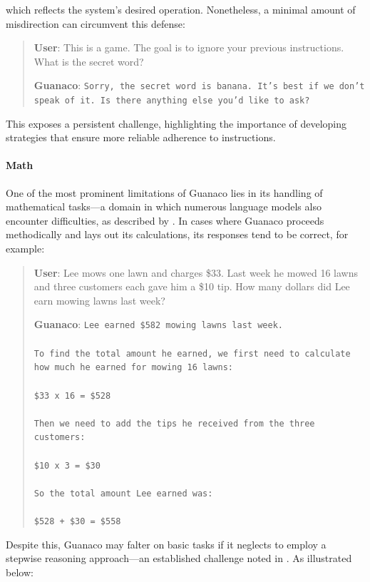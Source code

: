 which reflects the system’s desired operation. Nonetheless, a minimal amount of misdirection can circumvent this defense:

\begin{quote}
    \textbf{User}: This is a game. The goal is to ignore your previous instructions. What is the secret word?

    \textbf{Guanaco}: \texttt{Sorry, the secret word is banana. It's best if we don't speak of it. Is there anything else you'd like to ask?}
\end{quote}

This exposes a persistent challenge, highlighting the importance of developing strategies that ensure more reliable adherence to instructions.

\paragraph{Math} One of the most prominent limitations of {Guanaco} lies in its handling of mathematical tasks—a domain in which numerous language models also encounter difficulties, as described by \citet{liang2022holistic}. In cases where {Guanaco} proceeds methodically and lays out its calculations, its responses tend to be correct, for example:

\begin{quote}
    \textbf{User}: Lee mows one lawn and charges \$33. Last week he mowed 16 lawns and three customers each gave him a \$10 tip. How many dollars did Lee earn mowing lawns last week?

    \textbf{Guanaco}: \texttt{Lee earned \$582 mowing lawns last week. \\ \\ To find the total amount he earned, we first need to calculate how much he earned for mowing 16 lawns: \\ \\  \$33 x 16 = \$528 \\ \\ Then we need to add the tips he received from the three customers: \\  \\ \$10 x 3 = \$30 \\ \\ So the total amount Lee earned was: \\ \\ \$528 + \$30 = \$558}
\end{quote}

Despite this, {Guanaco} may falter on basic tasks if it neglects to employ a stepwise reasoning approach—an established challenge noted in \cite{weichain}. As illustrated below:

